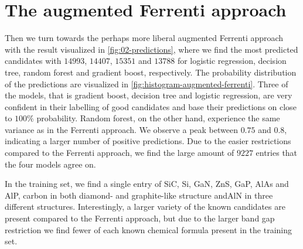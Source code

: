 \begin{comment}
\begin{table}[!ht]
\centering
\caption{Table of the number of predictions made with the optimal model for the insightful approach. }
\label{tab:timing-extraction}
\noindent\makebox[\textwidth]{
\begin{tabular}{M{3.0cm} M{4.0cm} M{4.0cm}}
  \hline
  \hline
   Model & Optimal number PC & Number of predictions \\
  \hline
  Logistic regression & $145$  & $454$ \\
  Decision trees      &  $3$   & $442$ \\
  Random forest       &  $10 $ & $325$ \\
  Gradient boost      &  $7$   & $699$ \\
  \hline
  \hline
\end{tabular}
}
\end{table}
\end{comment}


\section{The augmented Ferrenti approach}
Then we turn towards the perhaps more liberal augmented Ferrenti approach with the result visualized in \autoref{fig:02-predictions}, where we find the most predicted candidates with $14993$, $14407$, $15351$ and $13788$ for logistic regression, decision tree, random forest and gradient boost, respectively. The probability distribution of the predictions are visualized in \autoref{fig:histogram-augmented-ferrenti}. Three of the models, that is gradient boost, decision tree and logistic regression, are very confident in their labelling of good candidates and base their predictions on close to $100\%$ probability. Random forest, on the other hand, experience the same variance as in the Ferrenti approach. We observe a peak between $0.75$ and $0.8$, indicating a larger number of positive predictions. Due to the easier restrictions compared to the Ferrenti approach, we find the large amount of $9227$ entries that the four models agree on.



In the training set, we find a single entry of SiC, Si, GaN, ZnS, GaP, AlAs and AlP, carbon in both diamond- and graphite-like structure andAlN in three different structures. Interestingly, a larger variety of the known candidates are present compared to the Ferrenti approach, but due to the larger band gap restriction we find fewer of each known chemical formula present in the training set.

